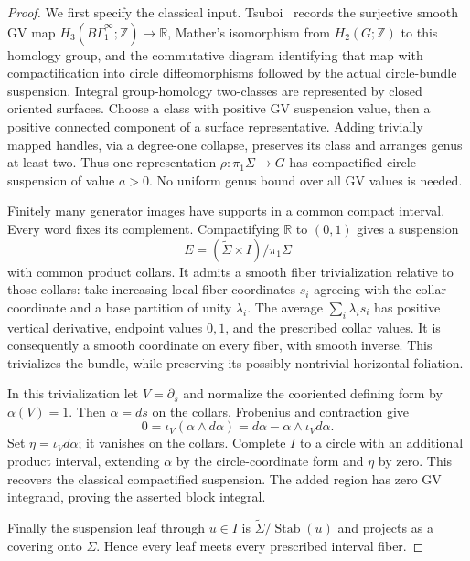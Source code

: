 \documentclass[11pt]{article}
\begin{document}
\begin{proof}
We first specify the classical input. Tsuboi~\cite[pp.~1--3,6]{T81}
records the surjective smooth GV map
$H_3(B\overline\Gamma^\infty_1;\mathbb Z)\to\mathbb R$, Mather's
isomorphism from $H_2(G;\mathbb Z)$ to this homology group, and the
commutative diagram identifying that map with compactification into
circle diffeomorphisms followed by the actual circle-bundle suspension.
Integral group-homology two-classes are represented by closed oriented
surfaces. Choose a class with positive GV suspension value, then a
positive connected component of a surface representative. Adding
trivially mapped handles, via a degree-one collapse, preserves its
class and arranges genus at least two. Thus one representation
$\rho:\pi_1\Sigma\to G$ has compactified circle suspension of value $a>0$.
No uniform genus bound over all GV values is needed.

Finitely many generator images have supports in a common compact
interval. Every word fixes its complement. Compactifying $\mathbb R$
to $(0,1)$ gives a suspension
\[
         E=(\widetilde\Sigma\times I)/\pi_1\Sigma
\]
with common product collars. It admits a smooth fiber trivialization
relative to those collars: take increasing local fiber coordinates
$s_i$ agreeing with the collar coordinate and a base partition of unity
$\lambda_i$. The average $\sum_i\lambda_i s_i$ has positive vertical
derivative, endpoint values $0,1$, and the prescribed collar values.
It is consequently a smooth coordinate on every fiber, with smooth
inverse. This trivializes the bundle, while preserving its possibly
nontrivial horizontal foliation.

In this trivialization let $V=\partial_s$ and normalize the cooriented
defining form by $\alpha(V)=1$. Then $\alpha=ds$ on the collars.
Frobenius and contraction give
\[
  0=\iota_V(\alpha\wedge d\alpha)
    =d\alpha-\alpha\wedge\iota_Vd\alpha .
\]
Set $\eta=\iota_Vd\alpha$; it vanishes on the collars.
Complete $I$ to a circle with an additional product interval, extending
$\alpha$ by the circle-coordinate form and $\eta$ by zero.
This recovers the classical compactified suspension. The added region
has zero GV integrand, proving the asserted block integral.

Finally the suspension leaf through $u\in I$ is
$\widetilde\Sigma/\operatorname{Stab}(u)$ and projects as a covering
onto $\Sigma$. Hence every leaf meets every prescribed interval fiber.
\end{proof}
\end{document}
